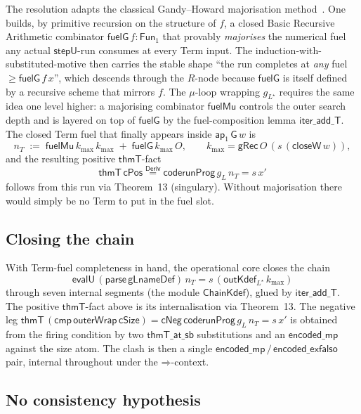 \documentclass[11pt]{article}
\newcommand{\Deriv}{\mathsf{Deriv}}
\newcommand{\thmT}{\mathsf{thmT}}
\newcommand{\evalU}{\mathsf{evalU}}
\newcommand{\parse}{\mathsf{parse}}
\newcommand{\outK}{\mathsf{outKdef}}
\newcommand{\closeW}{\mathsf{closeW}}
\newcommand{\codeF}{\mathsf{code}}
\newcommand{\ap}[1]{\mathsf{ap}_{#1}}
\newcommand{\Fun}[1]{\mathsf{Fun}_{#1}}
\newcommand{\imp}{\mathbin{\Rightarrow}}
\newcommand{\GG}{\mathsf{G}}
\newcommand{\Lstar}{L^{\!\star}}
\newcommand{\kmax}{k_{\max}}
\begin{document}
The resolution adapts the classical Gandy--Howard majorisation
method~\cite{Howard1973,Gandy1980}.
One builds, by primitive recursion on the structure of $f$, a closed Basic
Recursive Arithmetic combinator $\mathsf{fuelG}\,f : \Fun{1}$ that provably
\emph{majorises} the numerical fuel any actual $\mathsf{stepU}$-run
consumes at every Term input. The induction-with-substituted-motive
then carries the stable shape ``the run completes at \emph{any} fuel
$\geq \mathsf{fuelG}\,f\,x$'', which descends through the $R$-node
because $\mathsf{fuelG}$ is itself defined by a recursive scheme that
mirrors $f$. The $\mu$-loop wrapping $g_{\Lstar}$ requires the same
idea one level higher: a majorising combinator $\mathsf{fuelMu}$
controls the outer search depth and is layered on top of
$\mathsf{fuelG}$ by the fuel-composition lemma $\mathsf{iter\_add\_T}$.
The closed Term fuel that finally appears inside $\ap{1}\,\GG\,w$ is
\[
  n_T \;:=\; \mathsf{fuelMu}\,\kmax\,\kmax \;+\; \mathsf{fuelG}\,\kmax\,O,
  \qquad
  \kmax = \mathsf{gRec}\,O\,(s\,(\closeW\,w)),
\]
and the resulting positive $\thmT$-fact
\[
  \thmT\,\mathsf{cPos} \stackrel{\Deriv}{=}
    \codeF{\mathsf{runProg}\,g_L\,n_T = s\,x'}
\]
follows from this run via Theorem~13 (singulary). Without majorisation
there would simply be no Term to put in the fuel slot.

\subsection{Closing the chain}

With Term-fuel completeness in hand, the operational core closes the
chain
\[
  \evalU\,(\parse\,\mathsf{gLnameDef})\,n_T = s\,(\outK_{\Lstar}\,\kmax)
\]
through seven internal segments (the module $\mathsf{ChainKdef}$),
glued by $\mathsf{iter\_add\_T}$. The positive $\thmT$-fact above is its
internalisation via Theorem~13. The negative leg
$\thmT\,(\mathsf{cmp}\,\mathsf{outerWrap}\,\mathsf{cSize}) =
\mathsf{cNeg}\,\codeF{\mathsf{runProg}\,g_L\,n_T = s\,x'}$ is obtained
from the firing condition by two $\mathsf{thmT\_at\_sb}$ substitutions
and an $\mathsf{encoded\_mp}$ against the size atom. The clash is then a
single $\mathsf{encoded\_mp}\,/\,\mathsf{encoded\_exfalso}$ pair,
internal throughout under the $\imp$-context.

\subsection{No consistency hypothesis}
\end{document}
